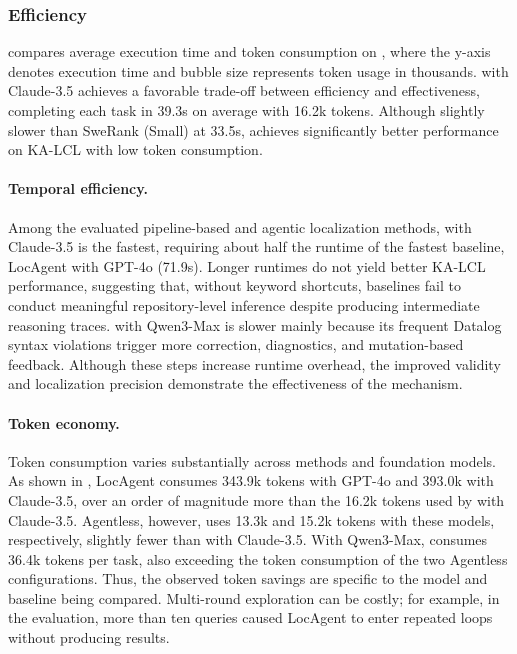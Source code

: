 \subsubsection{Efficiency}\label{sec:cost-dataloc}
 compares average execution time and token consumption on \dataset, where the y-axis denotes execution time and bubble size represents token usage in thousands. \tooldataloc with Claude-3.5 achieves a favorable trade-off between efficiency and effectiveness, completing each task in 39.3s on average with 16.2k tokens. Although slightly slower than SweRank (Small) at 33.5s, \tooldataloc achieves significantly better performance on KA-LCL with low token consumption.

\paragraph{Temporal efficiency.}
Among the evaluated pipeline-based and agentic localization methods, \tooldataloc with Claude-3.5 is the fastest, requiring about half the runtime of the fastest baseline, LocAgent with GPT-4o (71.9s). Longer runtimes do not yield better KA-LCL performance, suggesting that, without keyword shortcuts, baselines fail to conduct meaningful repository-level inference despite producing intermediate reasoning traces. \tooldataloc with Qwen3-Max is slower mainly because its frequent Datalog syntax violations trigger more correction, diagnostics, and mutation-based feedback. Although these steps increase runtime overhead, the improved validity and localization precision demonstrate the effectiveness of the mechanism.

\paragraph{Token economy.}
Token consumption varies substantially across methods and foundation models. As shown in , LocAgent consumes 343.9k tokens with GPT-4o and 393.0k with Claude-3.5, over an order of magnitude more than the 16.2k tokens used by \tooldataloc with Claude-3.5. Agentless, however, uses 13.3k and 15.2k tokens with these models, respectively, slightly fewer than \tooldataloc with Claude-3.5. With Qwen3-Max, \tooldataloc consumes 36.4k tokens per task, also exceeding the token consumption of the two Agentless configurations. Thus, the observed token savings are specific to the model and baseline being compared. Multi-round exploration can be costly; for example, in the evaluation, more than ten queries caused LocAgent to enter repeated loops without producing results.

